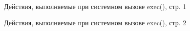 \documentclass[a4paper,oneside,14pt]{extreport}
\begin{document}
\newpage
\begin{figure}[h]
	\caption{Действия, выполняемые при системном вызове exec(), стр. 1}
	\label{exec1}
\end{figure}

\begin{figure}[h]
	\caption{Действия, выполняемые при системном вызове exec(), стр. 2}
	\label{exeс2}
\end{figure}
\end{document}
